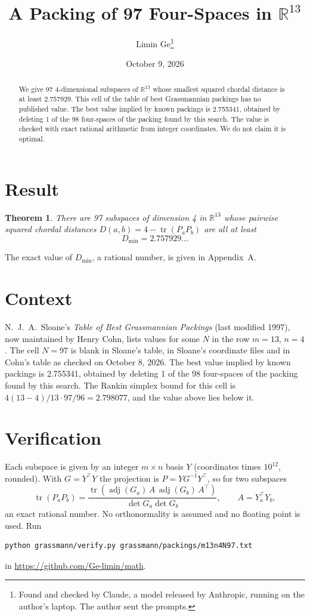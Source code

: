 \documentclass[11pt,a4paper]{article}
\title{A Packing of 97 Four-Spaces in $\mathbb{R}^{13}$}
\author{Limin Ge\thanks{Found and checked by Claude, a model released by Anthropic, running on the author's laptop. The author sent the prompts.}}
\date{October 9, 2026}
\newtheorem*{theorem}{Theorem}
\begin{document}
\maketitle
\begin{abstract}
We give 97 4-dimensional subspaces of $\mathbb{R}^{13}$ whose smallest squared chordal distance is at least 2.757929. This cell of the table of best Grassmannian packings has no published value. The best value implied by known packings is 2.755341, obtained by deleting 1 of the 98 four-spaces of the packing found by this search. The value is checked with exact rational arithmetic from integer coordinates. We do not claim it is optimal.
\end{abstract}

\section{Result}
\begin{theorem}
There are 97 subspaces of dimension 4 in $\mathbb{R}^{13}$ whose pairwise squared chordal distances $D(a,b) = 4 - \operatorname{tr}(P_aP_b)$ are all at least
\[ D_{\min} = 2.757929\ldots \]
\end{theorem}
The exact value of $D_{\min}$, a rational number, is given in Appendix~A.


\section{Context}
N.~J.~A.~Sloane's \emph{Table of Best Grassmannian Packings} (last modified 1997), now maintained by Henry Cohn, lists values for some $N$ in the row $m=13$, $n=4$. The cell $N=97$ is blank in Sloane's table, in Sloane's coordinate files and in Cohn's table as checked on October 8, 2026. The best value implied by known packings is 2.755341, obtained by deleting 1 of the 98 four-spaces of the packing found by this search. The Rankin simplex bound for this cell is $4(13-4)/13\cdot 97/96 = 2.798077$, and the value above lies below it.


\section{Verification}
Each subspace is given by an integer $m\times n$ basis $Y$ (coordinates times $10^{12}$, rounded). With $G=Y^\top Y$ the projection is $P=YG^{-1}Y^\top$, so for two subspaces
\[ \operatorname{tr}(P_aP_b)=\frac{\operatorname{tr}(\operatorname{adj}(G_a)\,A\,\operatorname{adj}(G_b)\,A^\top)}{\det G_a\det G_b},\qquad A=Y_a^\top Y_b, \]
an exact rational number. No orthonormality is assumed and no floating point is used. Run
\begin{verbatim}
python grassmann/verify.py grassmann/packings/m13n4N97.txt
\end{verbatim}
in \url{https://github.com/Ge-limin/math}.
\end{document}
